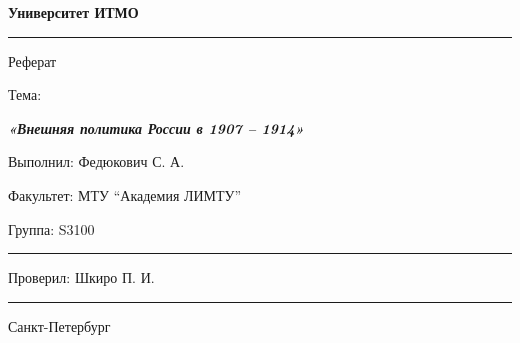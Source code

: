 \documentclass[12pt]{article}
\begin{document}
\pagestyle{empty}

\begin{center}
\large{\textbf{Университет ИТМО}}
\end{center}
\rule{500pt}{1pt}
\par\bigskip\par\bigskip\par\bigskip\par\bigskip\par\bigskip\par\bigskip\par\bigskip\par\bigskip
\begin{center}
\Large
Реферат

Тема:

\textbf{\textit{«Внешняя политика России в 1907 – 1914»}}
\end{center}
\par\bigskip\par\bigskip\par\bigskip\par\bigskip\par\bigskip\par\bigskip\par\bigskip\par\bigskip\par\bigskip\par\bigskip\par\bigskip\par\bigskip\par\bigskip\par\bigskip      
\begin{flushright}
\large
Выполнил: Федюкович С. А.
\par\bigskip
Факультет: МТУ “Академия ЛИМТУ”
\par\bigskip
Группа: S3100                       
\par\bigskip\par\bigskip\par\bigskip

\rule{150pt}{0.5pt}
\par\bigskip\par\bigskip\par\bigskip\par\bigskip                                                            
 Проверил: Шкиро П. И.
\par\bigskip \par\bigskip

\rule{150pt}{0.5pt}
\end{flushright}
\par\bigskip\par\bigskip\par\bigskip\par\bigskip\par\bigskip\par\bigskip\par\bigskip\par\bigskip\par\bigskip\par\bigskip     
\begin{center}
\large
Санкт-Петербург
\par{}
\end{center}
\newpage
\end{document}
